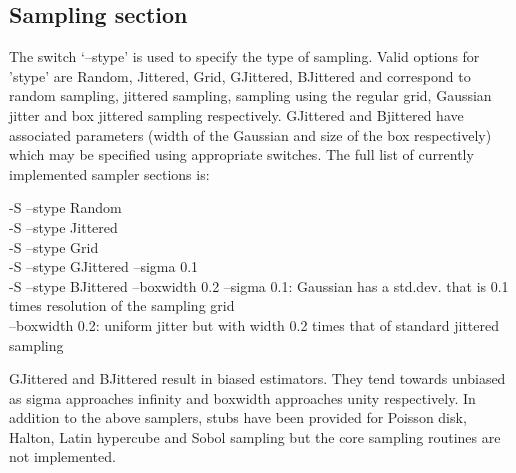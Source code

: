\subsection{Sampling section}
The switch `--stype' is used to specify the type of sampling. Valid options for 'stype' are Random, Jittered, Grid, GJittered, BJittered and correspond to random sampling, jittered sampling, sampling using the regular grid, Gaussian jitter and box jittered sampling respectively. GJittered and Bjittered have associated parameters (width of the Gaussian and size of the box respectively) which may be specified using appropriate switches. The full list of currently implemented sampler sections is:
\begin{tcolorbox}
  -S --stype Random \\
  -S --stype Jittered \\
  -S --stype Grid \\
  -S --stype GJittered --sigma 0.1 \\
  -S --stype BJittered --boxwidth 0.2 
\tcblower
   --sigma 0.1: Gaussian has a std.dev. that is 0.1 times resolution of the sampling grid \\
   --boxwidth 0.2: uniform jitter but with width 0.2 times that of standard jittered sampling 
\end{tcolorbox}
GJittered and BJittered result in biased estimators. They tend towards unbiased as sigma approaches infinity and boxwidth approaches unity respectively. In addition to the above samplers, stubs have been provided for Poisson disk, Halton, Latin hypercube and Sobol sampling but the core sampling routines are not implemented. 

